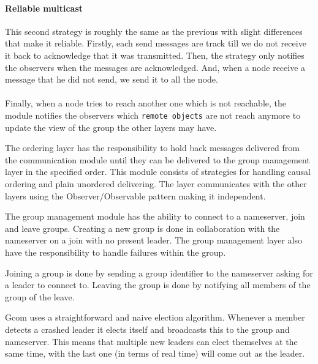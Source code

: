 \paragraph{Reliable multicast}{
    This second strategy is roughly the same as the previous with slight
 differences that make it reliable. Firstly, each send messages are track
 till we do not receive it back to acknowledge that it was transmitted.
 Then, the strategy only notifies the observers when the messages are
 acknowledged. And, when a node receive a message that he did not
 send, we send it to all the node. \newline
}

\paragraph{}{
    Finally, when a node tries to reach another one which is not
 reachable, the module notifies the observers which \texttt{remote objects}
 are not reach anymore to update the view of the group the other layers may have.
}

	The ordering layer has the responsibility to hold back messages delivered from the communication module until they can be delivered to the group management layer in the specified order.
	This module consists of strategies for handling causal ordering and plain unordered delivering.
	The layer communicates with the other layers using the Observer/Observable pattern making it independent.



	The group management module has the ability to connect to a nameserver, join and leave groups.
	Creating a new group is done in collaboration with the nameserver on a join with no present leader.
	The group management layer also have the responsibility to handle failures within the group.


	Joining a group is done by sending a group identifier to the nameserver asking for a leader to connect to.
	Leaving the group is done by notifying all members of the group of the leave.


		Gcom uses a straightforward and naive election algorithm.
		Whenever a member detects a crashed leader it elects itself and broadcasts this to the group and nameserver.
		This means that multiple new leaders can elect themselves at the same time, with the last one (in terms of real time) will come out as the leader.


